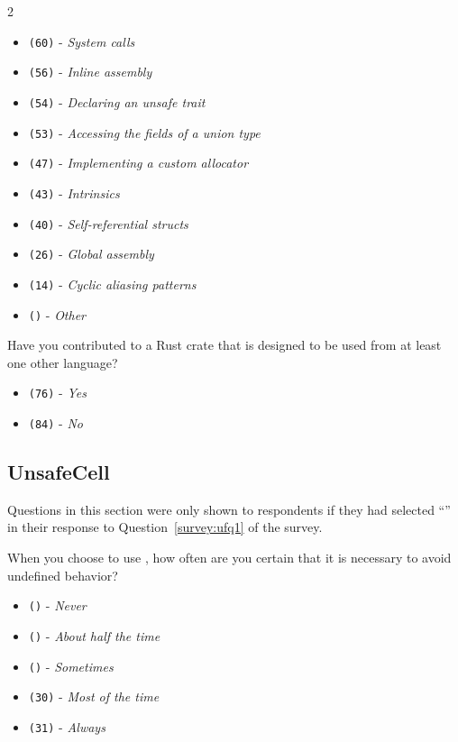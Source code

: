 \begin{protocol}
\begin{multicols}{2}
\begin{itemize}
\item \texttt{(60)} - \textit{System calls}
\item \texttt{(56)} - \textit{Inline assembly}
\item \texttt{(54)} - \textit{Declaring an unsafe trait}
\item \texttt{(53)} - \textit{Accessing the fields of a union type}
\item \texttt{(47)} - \textit{Implementing a custom allocator}
\item \texttt{(43)} - \textit{Intrinsics}
\item \texttt{(40)} - \textit{Self-referential structs}
\item \texttt{(26)} - \textit{Global assembly}
\item \texttt{(14)} - \textit{Cyclic aliasing patterns}
\item \texttt{()} - \textit{Other}
\end{itemize}
\end{multicols}
\item \label{survey:ufq3} Have you contributed to a Rust crate that is designed to be used from at least one other language?
\begin{itemize}
\item \texttt{(76)} - \textit{Yes}
\item \texttt{(84)} - \textit{No}
\end{itemize}
\end{protocol}

\subsection{UnsafeCell}
\label{survey:sec:q187}
Questions in this section were only shown to respondents if they had selected ``'' in their response to Question~\ref{survey:ufq1} of the survey.
\begin{protocol}
\item \label{survey:q187}  When you choose to use , how often are you certain that it is necessary to avoid undefined behavior?
\begin{itemize}
\item \texttt{()} - \textit{Never}
\item \texttt{()} - \textit{About half the time}
\item \texttt{()} - \textit{Sometimes}
\item \texttt{(30)} - \textit{Most of the time}
\item \texttt{(31)} - \textit{Always}
\end{itemize}
\end{protocol}

